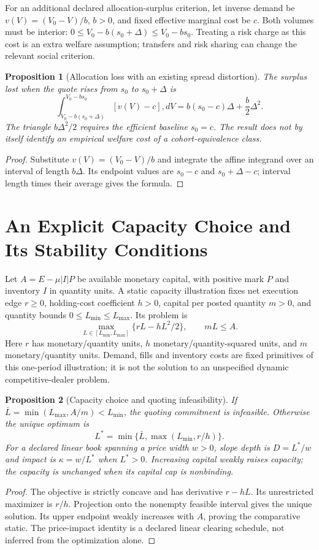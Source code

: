 \documentclass[11pt]{article}
\newtheorem{proposition}{Proposition}
\begin{document}
For an additional declared allocation-surplus criterion, let inverse demand be $v(V)=(V_0-V)/b$, $b>0$, and fixed effective marginal cost be $c$. Both volumes must be interior: $0\le V_0-b(s_0+\Delta)\le V_0-bs_0$. Treating a risk charge as this cost is an extra welfare assumption; transfers and risk sharing can change the relevant social criterion.
\begin{proposition}[Allocation loss with an existing spread distortion]
The surplus lost when the quote rises from $s_0$ to $s_0+\Delta$ is
\[
\int_{V_0-b(s_0+\Delta)}^{V_0-bs_0}[v(V)-c],dV
=b(s_0-c)\Delta+\frac b2\Delta^2.
\]
The triangle $b\Delta^2/2$ requires the efficient baseline $s_0=c$. The result does not by itself identify an empirical welfare cost of a cohort-equivalence class.
\end{proposition}
\begin{proof}
Substitute $v(V)=(V_0-V)/b$ and integrate the affine integrand over an interval of length $b\Delta$. Its endpoint values are $s_0-c$ and $s_0+\Delta-c$; interval length times their average gives the formula.
\end{proof}

\section{An Explicit Capacity Choice and Its Stability Conditions}
Let $A=E-\mu|I|P$ be available monetary capital, with positive mark $P$ and inventory $I$ in quantity units. A static capacity illustration fixes net execution edge $r\ge0$, holding-cost coefficient $h>0$, capital per posted quantity $m>0$, and quantity bounds $0\le L_{\min}\le L_{\max}$. Its problem is
\[
\max_{L\in[L_{\min},L_{\max}]}\{rL-hL^2/2\},\qquad mL\le A.
\]
Here $r$ has monetary/quantity units, $h$ monetary/quantity-squared units, and $m$ monetary/quantity units. Demand, fills and inventory costs are fixed primitives of this one-period illustration; it is not the solution to an unspecified dynamic competitive-dealer problem.
\begin{proposition}[Capacity choice and quoting infeasibility]
If $\bar L=\min(L_{\max},A/m)<L_{\min}$, the quoting commitment is infeasible. Otherwise the unique optimum is
\[
L^*=\min\{\bar L,\max(L_{\min},r/h)\}.
\]
For a declared linear book spanning a price width $w>0$, slope depth is $D=L^*/w$ and impact is $\kappa=w/L^*$ when $L^*>0$. Increasing capital weakly raises capacity; the capacity is unchanged when its capital cap is nonbinding.
\end{proposition}
\begin{proof}
The objective is strictly concave and has derivative $r-hL$. Its unrestricted maximizer is $r/h$. Projection onto the nonempty feasible interval gives the unique solution. Its upper endpoint weakly increases with $A$, proving the comparative static. The price-impact identity is a declared linear clearing schedule, not inferred from the optimization alone.
\end{proof}
\end{document}
